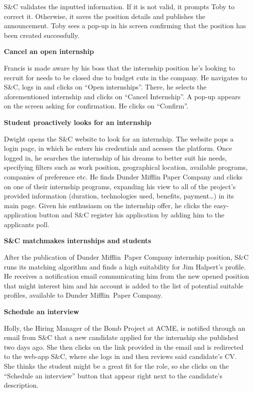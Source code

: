 S\&C validates the inputted information. If it is not valid, it prompts Toby to correct it. Otherwise, it saves the position details and publishes the announcement. Toby sees a pop-up in his screen confirming that the position has been created successfully. 

 
\textbf{Cancel an open internship}

Francis is made aware by his boss that the internship position he’s looking to recruit for needs to be closed due to budget cuts in the company. He navigates to S\&C, logs in and clicks on ``Open internships''. There, he selects the aforementioned internship and clicks on ``Cancel Internship''. A pop-up appears on the screen asking for confirmation. He clicks on “Confirm”. 

 
\textbf{Student proactively looks for an internship}

Dwight opens the S\&C website to look for an internship. The website pops a login page, in which he enters his credentials and acesses the platform. Once logged in, he searches the internship of his dreams to better suit his needs, specifying filters such as work position, geographical location, available programs, companies of preference etc. He finds Dunder Mifflin Paper Company and clicks on one of their internship programs, expanding his view to all of the project’s provided information (duration, technologies used, benefits, payment…) in its main page. Given his enthusiasm on the internship offer, he clicks the easy-application button and S\&C register his application by adding him to the applicants poll. 

 
\textbf{S\&C matchmakes internships and students}

After the publication of Dunder Mifflin Paper Company internship position, S\&C runs its matching algorithm and finds a high suitability for Jim Halpert’s profile. He receives a notification email communicating him from the new opened position that might interest him and his account is added to the list of potential suitable profiles, available to Dunder Mifflin Paper Company.

 
 
\textbf{Schedule an interview}

Holly, the Hiring Manager of the Bomb Project at ACME, is notified through an email from S\&C that a new candidate applied for the internship she published two days ago. She then clicks on the link provided in the email and is redirected to the web-app S\&C, where she logs in and then reviews said candidate’s CV. She thinks the student might be a great fit for the role, so she clicks on the “Schedule an interview” button that appear right next to the candidate’s description.

